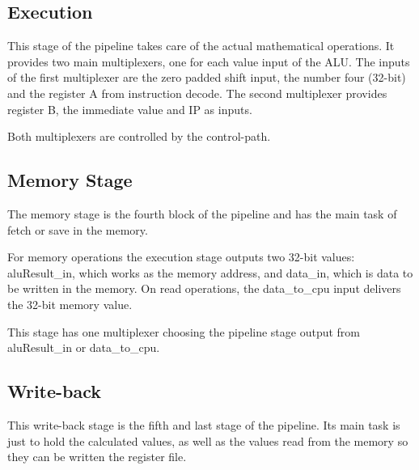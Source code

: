 \subsection{Execution}
This stage of the pipeline takes care of the actual mathematical operations. It provides two main multiplexers, one for each value input of the ALU.
The inputs of the first multiplexer are the zero padded shift input, the number four (32-bit) and the register A from instruction decode. The second multiplexer provides register B, 
the immediate value and IP as inputs.

Both multiplexers are controlled by the control-path.
\subsection{Memory Stage}
The memory stage is the fourth block of the pipeline and has the main task of fetch or save in the memory. 

For memory operations the execution stage outputs two 32-bit values: aluResult\_in, which works as the memory address, and data\_in, which is data to be written in the memory. 
On read operations, the data\_to\_cpu input delivers the 32-bit memory value.

This stage has one multiplexer choosing the pipeline stage output from aluResult\_in or data\_to\_cpu.
\subsection{Write-back}
This write-back stage is the fifth and last stage of the pipeline. Its main task is just to hold the calculated values, as well as the values read from the memory 
so they can be written the register file.
